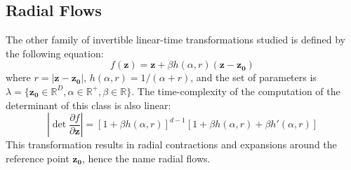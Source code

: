 \subsection{Radial Flows}
The other family of invertible linear-time transformations studied is defined by the following equation:
\begin{equation}
f(\mathbf{z}) = \mathbf{z} + \beta h(\alpha,r)(\mathbf{z}-\mathbf{z_0})
\end{equation}
where $r=\left| \mathbf{z}-\mathbf{z_0}\right|$, $h(\alpha,r) = 1/(\alpha+r)$, and the set of parameters is $\lambda = \{ \mathbf{z_0}\in \mathbb{R}^D, \alpha \in \mathbb{R} ^{+}, \beta \in \mathbb{R} \}$. The time-complexity of the computation of the determinant of this class is also linear:
\begin{equation}
\left| \det \frac{\partial f}{\partial \mathbf{z}} \right| = [1+\beta h(\alpha ,r)]^{d-1}[1+\beta h(\alpha ,r)+\beta h'(\alpha ,r)]
\end{equation}
This transformation results in radial contractions and expansions around the reference point $\mathbf{z_0}$, hence the name radial flows.


